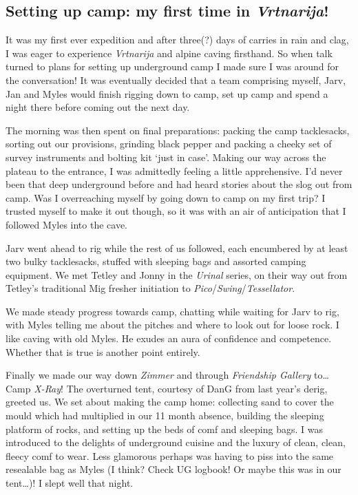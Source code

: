 
\hypertarget{setting-up-camp-my-first-time-in-vrtnarija}{%
\subsection{\texorpdfstring{Setting up camp: my first time in
\emph{Vrtnarija}!}{Setting up camp: my first time in Vrtnarija!}}\label{setting-up-camp-my-first-time-in-vrtnarija}}

It was my first ever expedition and after three(?) days of carries in
rain and clag, I was eager to experience \emph{Vrtnarija} and alpine
caving firsthand. So when talk turned to plans for setting up
underground camp I made sure I was around for the conversation! It was
eventually decided that a team comprising myself, Jarv, Jan and Myles
would finish rigging down to camp, set up camp and spend a night there
before coming out the next day.

The morning was then spent on final preparations: packing the camp
tacklesacks, sorting out our provisions, grinding black pepper and
packing a cheeky set of survey instruments and bolting kit `just in
case'. Making our way across the plateau to the entrance, I was
admittedly feeling a little apprehensive. I'd never been that deep
underground before and had heard stories about the slog out from camp.
Was I overreaching myself by going down to camp on my first trip? I
trusted myself to make it out though, so it was with an air of
anticipation that I followed Myles into the cave.

Jarv went ahead to rig while the rest of us followed, each encumbered by
at least two bulky tacklesacks, stuffed with sleeping bags and assorted
camping equipment. We met Tetley and Jonny in the \emph{Urinal} series,
on their way out from Tetley's traditional Mig fresher initiation to
\emph{Pico}/\emph{Swing}/\emph{Tessellator}.

We made steady progress towards camp, chatting while waiting for Jarv to
rig, with Myles telling me about the pitches and where to look out for
loose rock. I like caving with old Myles. He exudes an aura of
confidence and competence. Whether that is true is another point
entirely.

Finally we made our way down \emph{Zimmer} and through \emph{Friendship
Gallery} to\ldots{} Camp \emph{X-Ray}! The overturned tent, courtesy of
DanG from last year's derig, greeted us. We set about making the camp
home: collecting sand to cover the mould which had multiplied in our 11
month absence, building the sleeping platform of rocks, and setting up
the beds of comf and sleeping bags. I was introduced to the delights of
underground cuisine and the luxury of clean, clean, fleecy comf to wear.
Less glamorous perhaps was having to piss into the same resealable bag
as Myles (I think? Check UG logbook! Or maybe this was in our
tent\ldots{})! I slept well that night.

